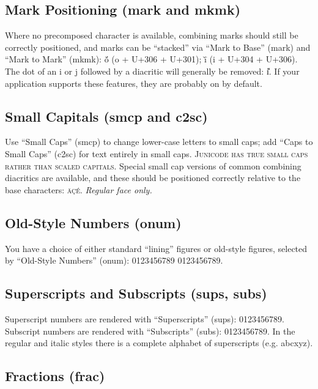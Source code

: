 \documentclass[12pt,a4paper,openany]{book}
\begin{document}
\subsection*{Mark Positioning (mark and mkmk)}

Where no precomposed character is available, combining marks should
still be correctly positioned, and marks can be “stacked” via “Mark
to Base” (mark) and “Mark to Mark” (mkmk): ŏ́ (o + U+306 + U+301);
ī̆ (i + U+304 + U+306).  The dot of an i or j followed by a diacritic
will generally be removed: i̽. If your application supports these
features, they are probably on by default.

\subsection*{Small Capitals (smcp and c2sc)}

Use “Small Caps” (smcp) to change lower-case letters to
small caps; add “Caps to Small Caps” (c2sc) for text entirely in small
caps. {\scshape Junicode has true small caps rather than scaled
  capitals.} Special small cap versions of common combining diacritics
are available, and these should be positioned correctly relative to
the base characters: {\scshape äçé}. {\itshape Regular face
  only.}

\subsection*{Old-Style Numbers (onum)}

You have a choice of either standard “lining” figures or old-style
figures, selected by “Old-Style Numbers” (onum): 0123456789
{0123456789.}

\subsection*{Superscripts and Subscripts (sups, subs)}

\noindent Superscript numbers are rendered with “Superscripts” (sups):
{ 0123456789}.  Subscript numbers
are rendered with “Subscripts” (subs):
{ 0123456789}. In the regular and
italic styles there is a complete alphabet of superscripts (e.g.
{abcxyz}).

\subsection*{Fractions (frac)}
\end{document}
